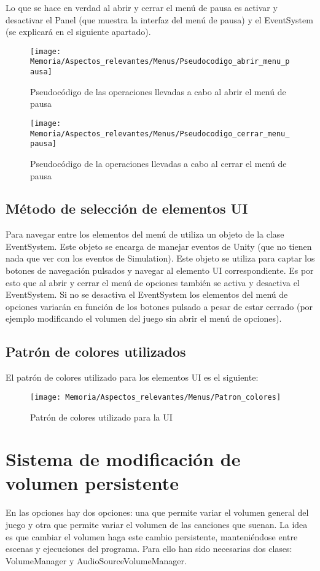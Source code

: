 Lo que se hace en verdad al abrir y cerrar el menú de pausa es activar y desactivar el Panel (que muestra la interfaz del menú de pausa) y el EventSystem (se explicará en el siguiente apartado).

\begin{figure}[h]
\texttt{[image: Memoria/Aspectos\_relevantes/Menus/Pseudocodigo\_abrir\_menu\_pausa]}
\caption{Pseudocódigo de las operaciones llevadas a cabo al abrir el menú de pausa}
\end{figure}

\begin{figure}[h]
\texttt{[image: Memoria/Aspectos\_relevantes/Menus/Pseudocodigo\_cerrar\_menu\_pausa]}
\caption{Pseudocódigo de la operaciones llevadas a cabo al cerrar el menú de pausa}
\end{figure}

\subsection{Método de selección de elementos UI}
Para navegar entre los elementos del menú de utiliza un objeto de la clase EventSystem. Este objeto se encarga de manejar eventos de Unity (que no tienen nada que ver con los eventos de Simulation). Este objeto se utiliza para captar los botones de navegación pulsados y navegar al elemento UI correspondiente. Es por esto que al abrir y cerrar el menú de opciones también se activa y desactiva el EventSystem. Si no se desactiva el EventSystem los elementos del menú de opciones variarán en función de los botones pulsado a pesar de estar cerrado (por ejemplo modificando el volumen del juego sin abrir el menú de opciones). 

\subsection{Patrón de colores utilizados}
El patrón de colores utilizado para los elementos UI es el siguiente:

\clearpage
\begin{figure}[h]
\texttt{[image: Memoria/Aspectos\_relevantes/Menus/Patron\_colores]}
\caption{Patrón de colores utilizado para la UI}
\end{figure}

\section{Sistema de modificación de volumen persistente}
En las opciones hay dos opciones: una que permite variar el volumen general del juego y otra que permite variar el volumen de las canciones que suenan. La idea es que cambiar el volumen haga este cambio persistente, manteniéndose entre escenas y ejecuciones del programa. Para ello han sido necesarias dos clases: VolumeManager y AudioSourceVolumeManager.

